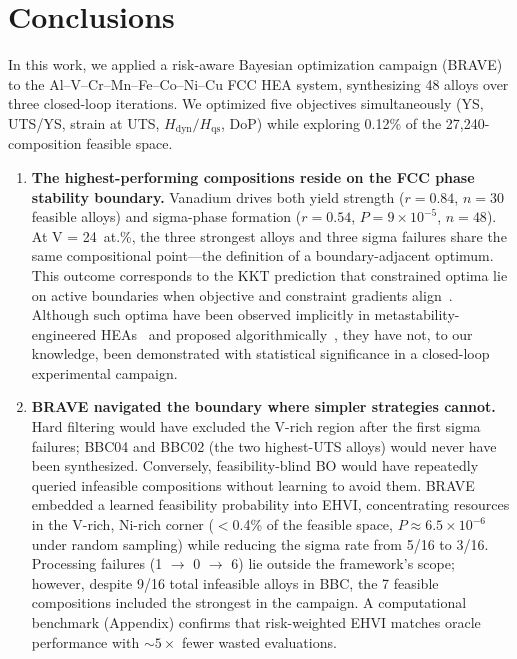 \section{Conclusions}\label{sec:Conclusion}

In this work, we applied a risk-aware Bayesian optimization campaign (BRAVE) to the Al--V--Cr--Mn--Fe--Co--Ni--Cu FCC HEA system, synthesizing 48 alloys over three closed-loop iterations. We optimized five objectives simultaneously (YS, UTS/YS, strain at UTS, $H_\text{dyn}/H_\text{qs}$, DoP) while exploring 0.12\% of the 27,240-composition feasible space.

\begin{enumerate}

\item \textbf{The highest-performing compositions reside on the FCC phase stability boundary.} Vanadium drives both yield strength ($r = 0.84$, $n = 30$ feasible alloys) and sigma-phase formation ($r = 0.54$, $P = 9 \times 10^{-5}$, $n = 48$). At V = 24~at.\%, the three strongest alloys and three sigma failures share the same compositional point---the definition of a boundary-adjacent optimum. This outcome corresponds to the KKT prediction that constrained optima lie on active boundaries when objective and constraint gradients align~\cite{nocedal2006numerical, ray2009infeasibility}. Although such optima have been observed implicitly in metastability-engineered HEAs~\cite{li2016metastable} and proposed algorithmically~\cite{tian2024boundary, maguire2025good}, they have not, to our knowledge, been demonstrated with statistical significance in a closed-loop experimental campaign.

\item \textbf{BRAVE navigated the boundary where simpler strategies cannot.} Hard filtering would have excluded the V-rich region after the first sigma failures; BBC04 and BBC02 (the two highest-UTS alloys) would never have been synthesized. Conversely, feasibility-blind BO would have repeatedly queried infeasible compositions without learning to avoid them. BRAVE embedded a learned feasibility probability into EHVI, concentrating resources in the V-rich, Ni-rich corner ($<$0.4\% of the feasible space, $P \approx 6.5 \times 10^{-6}$ under random sampling) while reducing the sigma rate from 5/16 to 3/16. Processing failures (1 $\rightarrow$ 0 $\rightarrow$ 6) lie outside the framework's scope; however, despite 9/16 total infeasible alloys in BBC, the 7 feasible compositions included the strongest in the campaign. A computational benchmark (Appendix) confirms that risk-weighted EHVI matches oracle performance with ${\sim}5\times$ fewer wasted evaluations.


\end{enumerate}
